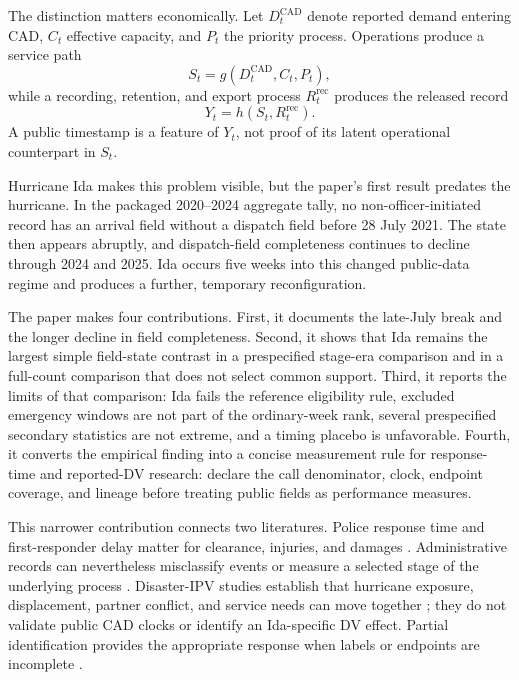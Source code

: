 \documentclass[11pt]{article}
\begin{document}
The distinction matters economically. Let $D_t^{\mathrm{CAD}}$ denote reported demand entering CAD, $C_t$ effective capacity, and $P_t$ the priority process. Operations produce a service path
\begin{equation}
S_t=g(D_t^{\mathrm{CAD}},C_t,P_t),
\end{equation}
while a recording, retention, and export process $R_t^{\mathrm{rec}}$ produces the released record
\begin{equation}
Y_t=h(S_t,R_t^{\mathrm{rec}}).
\end{equation}
A public timestamp is a feature of $Y_t$, not proof of its latent operational counterpart in $S_t$.

Hurricane Ida makes this problem visible, but the paper's first result predates the hurricane. In the packaged 2020--2024 aggregate tally, no non-officer-initiated record has an arrival field without a dispatch field before 28 July 2021. The state then appears abruptly, and dispatch-field completeness continues to decline through 2024 and 2025. Ida occurs five weeks into this changed public-data regime and produces a further, temporary reconfiguration.

The paper makes four contributions. First, it documents the late-July break and the longer decline in field completeness. Second, it shows that Ida remains the largest simple field-state contrast in a prespecified stage-era comparison and in a full-count comparison that does not select common support. Third, it reports the limits of that comparison: Ida fails the reference eligibility rule, excluded emergency windows are not part of the ordinary-week rank, several prespecified secondary statistics are not extreme, and a timing placebo is unfavorable. Fourth, it converts the empirical finding into a concise measurement rule for response-time and reported-DV research: declare the call denominator, clock, endpoint coverage, and lineage before treating public fields as performance measures.

This narrower contribution connects two literatures. Police response time and first-responder delay matter for clearance, injuries, and damages \citep{BlanesKirchmaier2018,DeAngeloTogerWeisburd2023,BrentBeland2020}. Administrative records can nevertheless misclassify events or measure a selected stage of the underlying process \citep{KlingerBridges1997,BoivinCordeau2011,SimpsonOrosco2021,KnoxLoweMummolo2020}. Disaster-IPV studies establish that hurricane exposure, displacement, partner conflict, and service needs can move together \citep{AnastarioShehabLawry2009,SchumacherEtAl2010,HarvilleTaylorTesfai2011,FirstEtAl2022}; they do not validate public CAD clocks or identify an Ida-specific DV effect. Partial identification provides the appropriate response when labels or endpoints are incomplete \citep{Manski1990,Manski2003,Molinari2020}.
\end{document}

